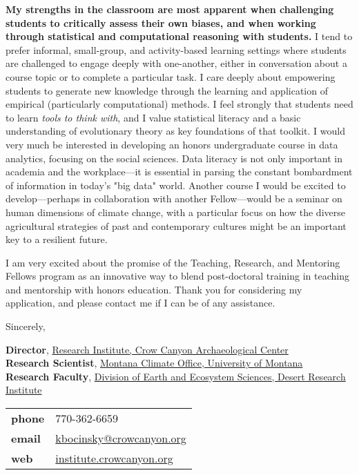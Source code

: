 \documentclass[letterpaper,11pt]{letter}
\begin{document}
\begin{letter}{}
{\bf My strengths in the classroom are most apparent when challenging students to critically assess their own biases, and when working through statistical and computational reasoning with students.} I tend to prefer informal, small-group, and activity-based learning settings where students are challenged to engage deeply with one-another, either in conversation about a course topic or to complete a particular task. I care deeply about empowering students to generate new knowledge through the learning and application of empirical (particularly computational) methods. I feel strongly that students need to learn \emph{tools to think with}, and I value statistical literacy and a basic understanding of evolutionary theory as key foundations of that toolkit. I would very much be interested in developing an honors undergraduate course in data analytics, focusing on the social sciences. Data literacy is not only important in academia and the workplace---it is essential in parsing the constant bombardment of information in today's "big data" world. Another course I would be excited to develop---perhaps in collaboration with another Fellow---would be a seminar on human dimensions of climate change, with a particular focus on how the diverse agricultural strategies of past and contemporary cultures might be an important key to a resilient future.

I am very excited about the promise of the Teaching, Research, and Mentoring Fellows program as an innovative way to blend post-doctoral training in teaching and mentorship with honors education. Thank you for considering my application, and please contact me if I can be of any assistance.

\thispagestyle{specialfooter}



\closing{Sincerely,}
\small
{\bf Director}, \href{http://www.crowcanyon.org/institute/}{Research Institute, Crow Canyon Archaeological Center} \\
{\bf Research Scientist}, \href{https://climate.umt.edu/}{Montana Climate Office, University of Montana} \\
{\bf Research Faculty}, \href{http://www.dri.edu/earth-ecosystem-sciences}{Division of Earth and Ecosystem Sciences, Desert Research Institute} \vspace{0.1in}\\
\begin{tabular}{@{}ll}
{\bf phone} & 770-362-6659 \\            
{\bf email} & \href{mailto:kbocinsky@crowcanyon.org}{kbocinsky@crowcanyon.org} \\         
{\bf web} & \href{https://institute.crowcanyon.org/}{institute.crowcanyon.org}\\   
\end{tabular}


\end{letter}
\end{document}
